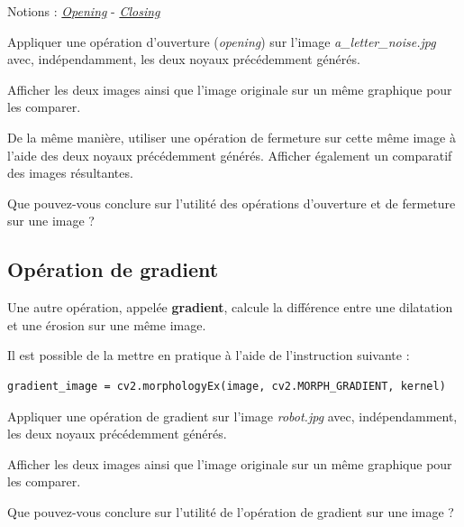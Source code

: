 \documentclass[a4paper,11pt,titlepage]{article} %
\begin{document}
\begin{mdframed}[style=sidebar,frametitle={}]
Notions : \href{https://iogs-lense-training.github.io/image-processing/contents/opencv_open_close.html#opening-operation}{\textit{Opening}} - \href{https://iogs-lense-training.github.io/image-processing/contents/opencv_open_close.html#closing-operation}{\textit{Closing}} 
\end{mdframed}

\Manip Appliquer une opération d'ouverture (\textit{opening}) sur l'image \textsl{a\_letter\_noise.jpg} avec, indépendamment, les deux noyaux précédemment générés. 

\Manip Afficher les deux images ainsi que l'image originale sur un même graphique pour les comparer.

\Manip De la même manière, utiliser une opération de fermeture sur cette même image à l'aide des deux noyaux précédemment générés. Afficher également un comparatif des images résultantes.

\Quest Que pouvez-vous conclure sur l'utilité des opérations d'ouverture et de fermeture sur une image ?



\subsection{Opération de gradient}

Une autre opération, appelée \textbf{gradient}, calcule la différence entre une dilatation et une érosion sur une même image. 

Il est possible de la mettre en pratique à l'aide de l'instruction suivante :

\begin{lstlisting}
gradient_image = cv2.morphologyEx(image, cv2.MORPH_GRADIENT, kernel)
\end{lstlisting}

\Manip Appliquer une opération de gradient sur l'image \textsl{robot.jpg} avec, indépendamment, les deux noyaux précédemment générés. 

\Manip Afficher les deux images ainsi que l'image originale sur un même graphique pour les comparer.

\Quest Que pouvez-vous conclure sur l'utilité de l'opération de gradient sur une image ?

\end{document}
